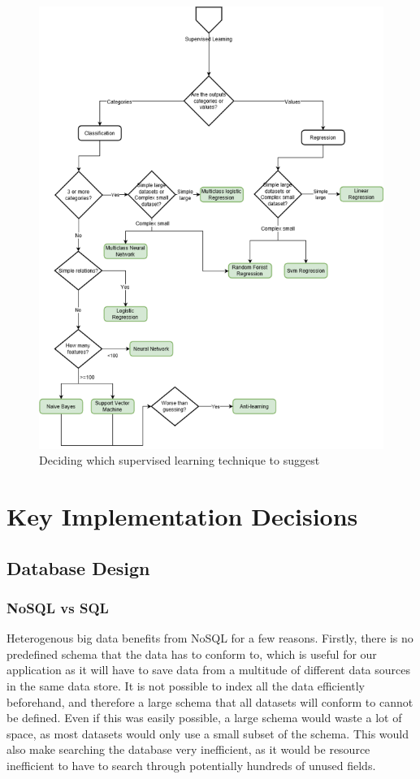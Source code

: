 \documentclass[titlepage]{article}
\begin{document}
\begin{figure}[h!]
  \centering
  \includegraphics[width=\textwidth]{supervised-decision}
  \caption{Deciding which supervised learning technique to suggest}
  \label{supervised-decision}
\end{figure} \pagebreak

\section{Key Implementation Decisions}
\subsection{Database Design}

\subsubsection{NoSQL vs SQL}
Heterogenous big data benefits from NoSQL for a few reasons. Firstly, there is no predefined schema that the data has to conform to, which is useful for our application as it will have to save data from a multitude of different data sources in the same data store. It is not possible to index all the data efficiently beforehand, and therefore a large schema that all datasets will conform to cannot be defined. Even if this was easily possible, a large schema would waste a lot of space, as most datasets would only use a small subset of the schema. This would also make searching the database very inefficient, as it would be resource inefficient to have to search through potentially hundreds of unused fields.
\end{document}

